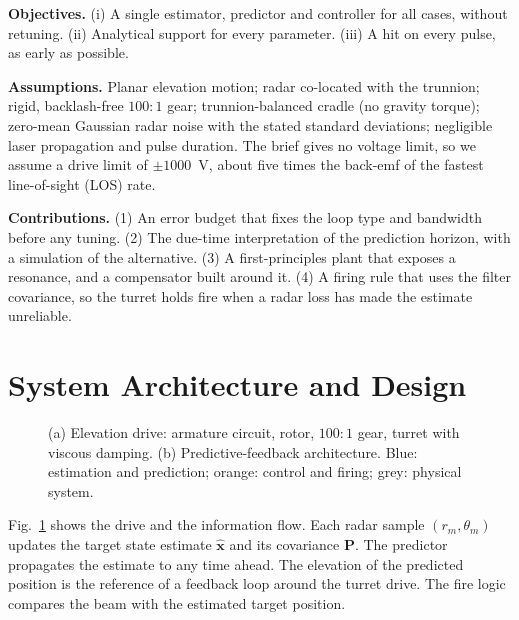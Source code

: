 \documentclass[conference]{IEEEtran}
\begin{document}
\textbf{Objectives.} (i) A single estimator, predictor and controller for all cases, without retuning. (ii) Analytical support for every parameter. (iii) A hit on every pulse, as early as possible.

\textbf{Assumptions.} Planar elevation motion; radar co-located with the trunnion; rigid, backlash-free $100{:}1$ gear; trunnion-balanced cradle (no gravity torque); zero-mean Gaussian radar noise with the stated standard deviations; negligible laser propagation and pulse duration. The brief gives no voltage limit, so we assume a drive limit of $\pm1000$~V, about five times the back-emf of the fastest line-of-sight (LOS) rate.

\textbf{Contributions.} (1) An error budget that fixes the loop type and bandwidth before any tuning. (2) The due-time interpretation of the prediction horizon, with a simulation of the alternative. (3) A first-principles plant that exposes a resonance, and a compensator built around it. (4) A firing rule that uses the filter covariance, so the turret holds fire when a radar loss has made the estimate unreliable.

\section{System Architecture and Design}
\begin{figure}[t]
\centering
\resizebox{0.97\textwidth}{!}{}
\caption{(a) Elevation drive: armature circuit, rotor, $100{:}1$ gear, turret with viscous damping. (b) Predictive-feedback architecture. Blue: estimation and prediction; orange: control and firing; grey: physical system.}
\label{fig:arch}
\end{figure}

Fig.~\ref{fig:arch} shows the drive and the information flow. Each radar sample $(r_m,\theta_m)$ updates the target state estimate $\hat{\mathbf x}$ and its covariance $\mathbf P$. The predictor propagates the estimate to any time ahead. The elevation of the predicted position is the reference of a feedback loop around the turret drive. The fire logic compares the beam with the estimated target position.
\end{document}
